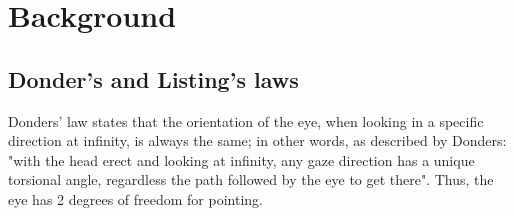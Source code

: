 
\chapter{Background}

\section{Donder's and Listing's laws}
\label{appendix:cha1:listings}

Donders' law states that the orientation of the eye, when looking in a specific direction at infinity, is always the same; in other words, as described by Donders: "with the head erect and looking at infinity, any gaze direction has a unique torsional angle, regardless the path followed by the eye to get there". Thus, the eye has 2 degrees of freedom for pointing.

